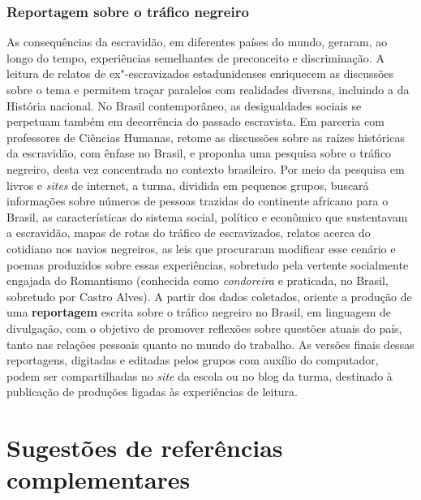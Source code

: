 \documentclass[11pt]{extarticle}
\begin{document}
\subsubsection{Reportagem sobre o tráfico negreiro}


As consequências da escravidão, em diferentes países do mundo,
geraram, ao longo do tempo, experiências semelhantes de preconceito e
discriminação. A leitura de relatos de ex"-escravizados estadunidenses
enriquecem as discussões sobre o tema e permitem traçar paralelos com
realidades diversas, incluindo a da História nacional. No Brasil
contemporâneo, as desigualdades sociais se perpetuam também em
decorrência do passado escravista. Em parceria com professores de
Ciências Humanas, retome as discussões sobre as raízes históricas da
escravidão, com ênfase no Brasil, e proponha uma pesquisa sobre o
tráfico negreiro, desta vez concentrada no contexto brasileiro. Por
meio da pesquisa em livros e \emph{sites} de internet, a turma,
dividida em pequenos grupos, buscará informações sobre números de
pessoas trazidas do continente africano para o Brasil, as
características do sistema social, político e econômico que
sustentavam a escravidão, mapas de rotas do tráfico de escravizados,
relatos acerca do cotidiano nos navios negreiros, as leis que
procuraram modificar esse cenário e poemas produzidos sobre essas
experiências, sobretudo pela vertente socialmente engajada do
Romantismo (conhecida como \emph{condoreira} e praticada, no Brasil,
sobretudo por Castro Alves). A partir dos dados coletados, oriente a
produção de uma \textbf{reportagem} escrita sobre o tráfico negreiro
no Brasil, em linguagem de divulgação, com o objetivo de promover
reflexões sobre questões atuais do país, tanto nas relações pessoais
quanto no mundo do trabalho. As versões finais dessas reportagens,
digitadas e editadas pelos grupos com auxílio do computador, podem ser
compartilhadas no \emph{site} da escola ou no blog da turma, destinado
à publicação de produções ligadas às experiências de leitura.

\section{Sugestões de referências complementares}\label{sugestoes}
\end{document}
